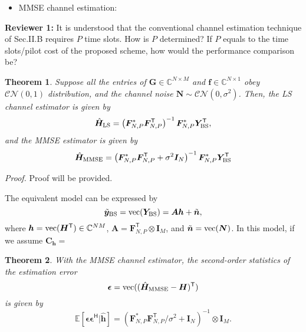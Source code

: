 \documentclass[a4paper,12pt]{article}
\newtheorem{theorem}{\bf Theorem}
\def \T {^{\mathsf{T}}}
\def \H {^{\mathsf{H}}}
\begin{document}
{{\begin{itemize}
    \item MMSE channel estimation: 
\end{itemize} 


}}

\textbf{Reviewer 1:}
It is understood that the conventional channel estimation technique of Sec.II.B requires $P$ time slots. How is $P$ determined? If $P$ equals to the time slots/pilot cost of the proposed scheme, how would the performance comparison be?

{}


\begin{theorem} 
    Suppose all the entries of ${\bm G}\in\mathbb{C}^{N\times M}$ and ${\bm f}\in\mathbb{C}^{N\times 1}$ obey ${\mathcal{CN}(0,1)}$ distribution, and the channel noise ${\bm N}\sim \mathcal{CN}(0,\sigma^2)$. 
    Then, the LS channel estimator is given by 
    \begin{equation}
        \hat{\bm{H}}_{\rm LS} = \left( {\bm F}_{N,P}^{*} {\bm F_{N,P}\T} \right)^{-1}{\bm F}_{N,P}^{*}{\bm Y}_{\rm BS}\T,
    \end{equation}
    and the MMSE estimator is given by 
    \begin{equation}
        \hat{\bm{H}}_{\rm MMSE} = \left( {\bm F}_{N,P}^{*} {\bm F_{N,P}\T + \sigma^2 {\bm I}_N} \right)^{-1}{\bm F}_{N,P}^{*}{\bm Y}_{\rm BS}\T
    \end{equation}
\end{theorem}

{\it Proof.}
Proof will be provided. 

The equivalent model can be expressed by 
\begin{equation}
    \tilde{\bm y}_{\rm BS} = {\rm vec}({\bm Y}_{\rm BS}) = {\bm A}{\bm h} + \tilde{\bm n},
\end{equation}
where ${\bm h} = {\rm vec}({\bm H}\T)\in\mathbb{C}^{NM}$, ${\bm A} = {\bm F}_{N,P}\T\otimes {\bm I}_M$, and $\tilde{\bm n} = {\rm vec}({\bm N})$. In this model, if we assume ${\bm C}_{\bm h} = $ 

\begin{theorem}
    With the MMSE channel estimator, the second-order statistics of the estimation error 
    \begin{equation}
        {\bm \epsilon} = {\rm vec}((\hat{{\bm H}}_{\rm MMSE} - {\bm H})\T)  
    \end{equation}
    is given by 
    \begin{equation}
        \mathbb{E}[{\bm \epsilon}{\bm \epsilon}\H | \hat{\bm h}] = \left( {\bm F}_{N,P}^{*} {\bm F_{N,P}\T / \sigma^2 + {\bm I}_N} \right)^{-1} \otimes {\bm I}_M.
    \end{equation}
\end{theorem}
\end{document}
